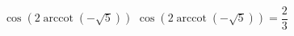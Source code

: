  {$\cos\left(2 \operatorname{arccot}\left(-\sqrt{5}\right)\right)$ }
{ $\cos\left(2 \operatorname{arccot}\left(-\sqrt{5}\right)\right) = \dfrac{2}{3}$ }

